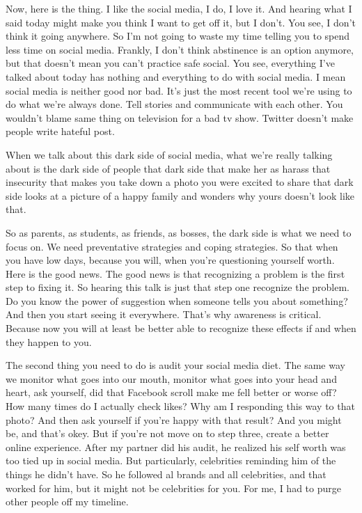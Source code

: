 \documentclass[UTF8,12pt,a4paper]{article}
\theoremstyle{Problem}
\theoremstyle{Solution}
\begin{document}
\begin{appendix}
    Now, here is the thing. I like the social media, I do, I love it. And hearing what I said today might make you think I want to get off it, but I don't. You see, I don't think it going anywhere. So I'm not going to waste my time telling you to spend less time on social media. Frankly, I don't think abstinence is an option anymore, but that doesn't mean you can't practice safe social. You see, everything I've talked about today has nothing and everything to do with social media. I mean social media is neither good nor bad. It's just the most recent tool we're using to do what we're always done. Tell stories and communicate with each other. You wouldn't blame same thing on television for a bad tv show. Twitter doesn't make people write hateful post.
    
    When we talk about this dark side of social media, what we're really talking about is the dark side of people that dark side that make her as harass that insecurity that makes you take down a photo you were excited to share that dark side looks at a picture of a happy family and wonders why yours doesn't look like that. 
    
    So as parents, as students, as friends, as bosses, the dark side is what we need to focus on. We need preventative strategies and coping strategies. So that when you have low days, because you will, when you're questioning yourself worth. Here is the good news. The good news is that recognizing a problem is the first step to fixing it. So hearing this talk is just that step one recognize the problem. Do you know the power of suggestion when someone tells you about something? And then you start seeing it everywhere. That's why awareness is critical. Because now you will at least be better able to recognize these effects if and when they happen to you. 
    
    The second thing you need to do is audit your social media diet. The same way we monitor what goes into our mouth, monitor what goes into your head and heart, ask yourself, did that Facebook scroll make me fell better or worse off? How many times do I actually check likes? Why am I responding this way to that photo? And then ask yourself if you're happy with that result? And you might be, and that's okey. But if you're not move on to step three, create a better online experience. After my partner did his audit, he realized his self worth was too tied up in social media. But particularly, celebrities reminding him of the things he didn't have. So he followed al brands and all celebrities, and that worked for him, but it might not be celebrities for you. For me, I had to purge other people off my timeline. 
    

\end{appendix}
\end{document}
